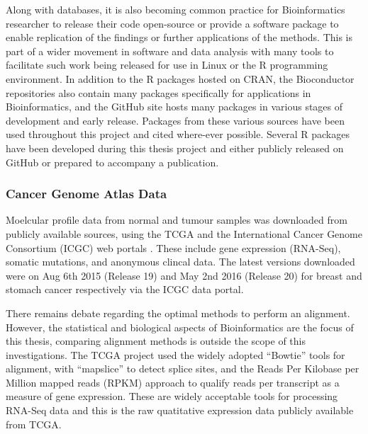 Along with databases, it is also becoming common practice for Bioinformatics researcher to release their code open-source or provide a software package to enable replication of the findings or further applications of the methods. This is part of a wider movement in software and data analysis with many tools to facilitate such work being released for use in Linux or the R programming environment. In addition to the R packages hosted on CRAN, the Bioconductor repositories also contain many packages specifically for applications in Bioinformatics, and the GitHub site hosts many packages in various stages of development and early release. Packages from these various sources have been used throughout this project and cited where-ever possible. Several R packages have been developed during this thesis project and either publicly released on GitHub or prepared to accompany a publication.

\subsubsection{Cancer Genome Atlas Data}
Moelcular profile data from normal and tumour samples was downloaded from publicly available sources, using the TCGA \citep{TCGA2012} and the International Cancer Genome Consortium (ICGC) web portals \citep{ICGC2011}. These include gene expression (RNA-Seq), somatic mutations, and anonymous clincal data. The latest versions downloaded were on Aug 6th 2015 (Release 19) and May 2nd 2016 (Release 20) for breast and stomach cancer respectively via the ICGC data portal.

There remains debate regarding the optimal methods to perform an alignment. However, the statistical and biological aspects of Bioinformatics are the focus of this thesis, comparing alignment methods is outside the scope of this investigations. The TCGA project used the widely adopted ``Bowtie'' tools for alignment, with ``mapslice'' to detect splice sites, and the Reads Per Kilobase per Million mapped reads (RPKM) approach to qualify reads per transcript as a measure of gene expression. These are widely acceptable tools for processing RNA-Seq data and this is the raw quatitative expression data publicly available from TCGA.


